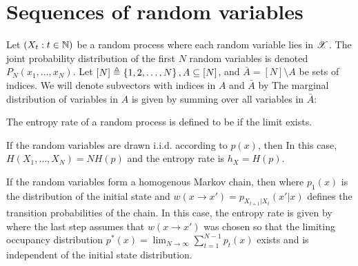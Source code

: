 \documentclass[letterpaper,10pt,english]{article}
\begin{document}
\section{Sequences of random variables}
Let $(X_t: t \in \mathbb{N})$ be a random process where each random variable lies in $\mathscr{X}$. 
The joint probability distribution of the first $N$ random variables is denoted 
$P_N (x_1, \dots , x_N)$. 
Let $[N] \triangleq \left\{1,2, \dots,N\right\}, A \subseteq [N]$, and $\bar{A} = [N]\setminus A$ be sets of indices. 
We will denote subvectors with indices in $A$ and $\bar{A}$ by
The marginal distribution of variables in $A$ is given by summing over all variables in $\bar{A}$: 
\begin{defn}
The entropy rate of a random process is defined to be
if the limit exists.
\end{defn} 
\begin{exmp}
If the random variables are drawn i.i.d. according to $p(x)$, then 
In this case, $H (X_1, \dots,X_N) = NH (p)$ and the entropy rate is $h_X = H (p)$.
\end{exmp} 
\begin{exmp}
If the random variables form a homogenous Markov chain, then 
where $p_1(x)$ is the distribution of the initial state and $w(x \to x') = p_{X_{t+1}|X_t} (x'|x)$ defines the transition probabilities of the chain. 
In this case, the entropy rate is given by
where the last step assumes that $w(x \to x')$ was chosen so that the limiting occupancy
distribution $p^{\ast}(x) = \lim_{N \to \infty} \sum_{t=1}^{N-1}p_t(x)$ exists and is independent of the initial state distribution. 
\end{exmp}
\end{document}
